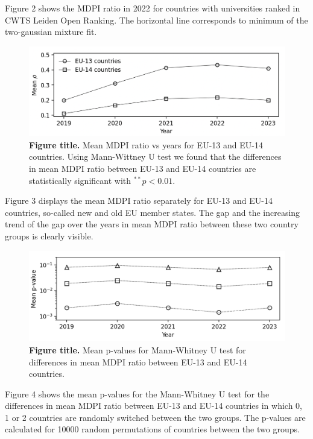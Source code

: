 \documentclass[amsfonts, amssymb, prl, superscriptaddress, notitlepage, twocolumn, nofootinbib]{revtex4-2}
\begin{document}
Figure 2 shows the MDPI ratio in 2022 for countries with universities ranked in CWTS Leiden Open Ranking. The horizontal line corresponds to minimum of the two-gaussian mixture fit.

\begin{figure}
    \centering
    \includegraphics[width=1.0\linewidth]{Fig02f.png}
    \caption{\label{fig:fig3} {\bf Figure title.} Mean MDPI ratio vs years for EU-13 and EU-14 countries. Using Mann-Wittney U test we found that the differences in mean MDPI ratio between EU-13 and EU-14 countries are statistically significant with $^{**}p<0.01$.
    }
\end{figure}

Figure 3 displays the mean MDPI ratio separately for EU-13 and EU-14 countries, so-called new and old EU member states. The
gap and the increasing trend of the gap over the years in mean MDPI ratio between these two country groups is clearly visible. 

\begin{figure}
    \centering
    \includegraphics[width=1.0\linewidth]{Fig02af.png}
    \caption{\label{fig:fig4} {\bf Figure title.} Mean p-values for Mann-Whitney U test for differences in mean MDPI ratio between EU-13 and EU-14 countries.
    }
\end{figure}

Figure 4 shows the mean p-values for the Mann-Whitney U test for the differences in mean MDPI ratio between EU-13 and EU-14 countries in which 0, 1 or 2 countries are randomly switched between the two groups. The p-values are calculated for 10000 random permutations of countries between the two groups.
\end{document}
